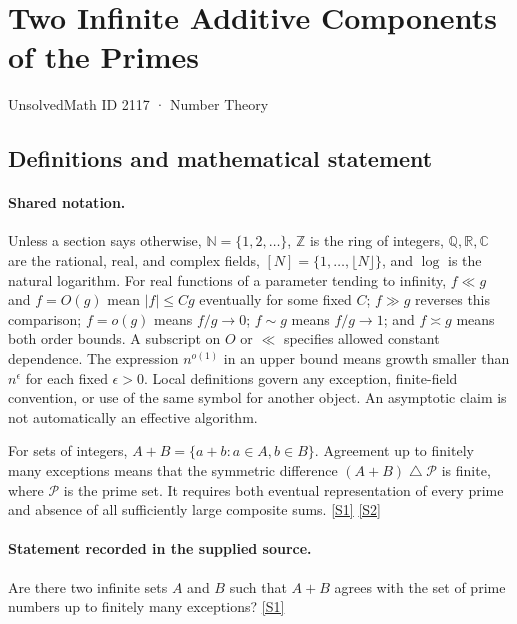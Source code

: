\documentclass[11pt,a4paper]{article}
\newcommand{\N}{\mathbb{N}}
\newcommand{\Z}{\mathbb{Z}}
\newcommand{\Q}{\mathbb{Q}}
\newcommand{\R}{\mathbb{R}}
\newcommand{\C}{\mathbb{C}}
\newcommand{\sref}[2]{\hyperlink{source:#1:#2}{[S#2]}}
\begin{document}

\setcounter{section}{2116}

\section{Two Infinite Additive Components of the Primes}\label{2117}

{\small\sffamily UnsolvedMath ID 2117 · Number Theory}

\subsection{Definitions and mathematical statement}

\paragraph{Shared notation.}Unless a section says otherwise, $\N=\{1,2,\ldots\}$,
$\Z$ is the ring of integers, $\Q,\R,\C$ are the rational, real, and complex
fields, $[N]=\{1,\ldots,\lfloor N\rfloor\}$, and $\log$ is the natural
logarithm. For real functions of a parameter tending to infinity,
$f\ll g$ and $f=O(g)$ mean $|f|\leq Cg$ eventually for some fixed $C$;
$f\gg g$ reverses this comparison; $f=o(g)$ means $f/g\to0$;
$f\sim g$ means $f/g\to1$; and $f\asymp g$ means both order bounds.
A subscript on $O$ or $\ll$ specifies allowed constant dependence.
The expression $n^{o(1)}$ in an upper bound means growth smaller than
$n^\epsilon$ for each fixed $\epsilon>0$. Local definitions govern any
exception, finite-field convention, or use of the same symbol for another
object. An asymptotic claim is not automatically an effective algorithm.



For sets of integers, $A+B=\{a+b:a\in A,b\in B\}$. Agreement up to finitely many exceptions means that the symmetric difference $(A+B)\mathbin{\triangle}\mathcal P$ is finite, where $\mathcal P$ is the prime set. It requires both eventual representation of every prime and absence of all sufficiently large composite sums. \sref{2117}{1} \sref{2117}{2}

\paragraph{Statement recorded in the supplied source.}
Are there two infinite sets $A$ and $B$ such that $A+B$ agrees with the set of prime numbers up to finitely many exceptions? \sref{2117}{1}
\end{document}
